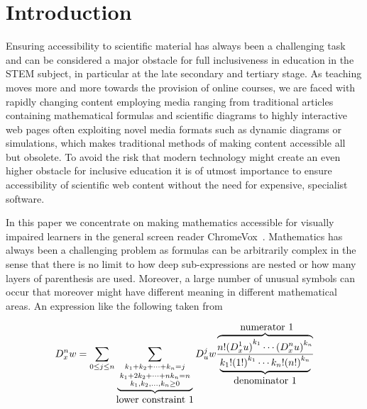 \documentclass{sig-alternate}
\begin{document}


\section{Introduction}\label{sec:intro} 
Ensuring accessibility to scientific material has always been a challenging task
and can be considered a major obstacle for full inclusiveness in education in
the STEM subject, in particular at the late secondary and tertiary stage. As
teaching moves more and more towards the provision of online courses, we are
faced with rapidly changing content employing media ranging from traditional
articles containing mathematical formulas and scientific diagrams to highly
interactive web pages often exploiting novel media formats such as dynamic
diagrams or simulations, which makes traditional methods of making content
accessible all but obsolete. To avoid the risk that modern technology might
create an even higher obstacle for inclusive education it is of utmost
importance to ensure accessibility of scientific web content without the need
for expensive, specialist software.

In this paper we concentrate on making mathematics accessible for visually
impaired learners in the general screen reader
ChromeVox~\cite{google:chromevox-tutorial}. Mathematics has always been a
challenging problem as formulas can be arbitrarily complex in the sense that
there is no limit to how deep sub-expressions are nested or how many layers of
parenthesis are used. Moreover, a large number of unusual symbols can occur that
moreover might have different meaning in different mathematical areas. An
expression like the following taken from~\cite{knuthart}

{\small
\begin{equation*}
D^n_xw = \sum_{0\le j\le n} \sum_{\underbrace{{\scriptstyle
        k_1+k_2+\cdots+k_n=j \atop {\scriptstyle
          k_1+2k_2+\cdots+nk_n=n \atop {\scriptstyle
            k_1,k_2,\ldots,k_n\ge0 }}}}_{\mbox{lower constraint
        1}}} D^j_u w
  \frac{\overbrace{n!  {(D^1_x u)}^{k_1} \cdots
      {(D^n_x u)}^{k_n}} ^{\mbox{ numerator 1}}}
  {\underbrace{k_1!{(1!)}^{k_1}
    \cdots k_n!{(n!)}^{k_n}}_{\mbox{denominator 1}}}
\end{equation*}}
\end{document}
